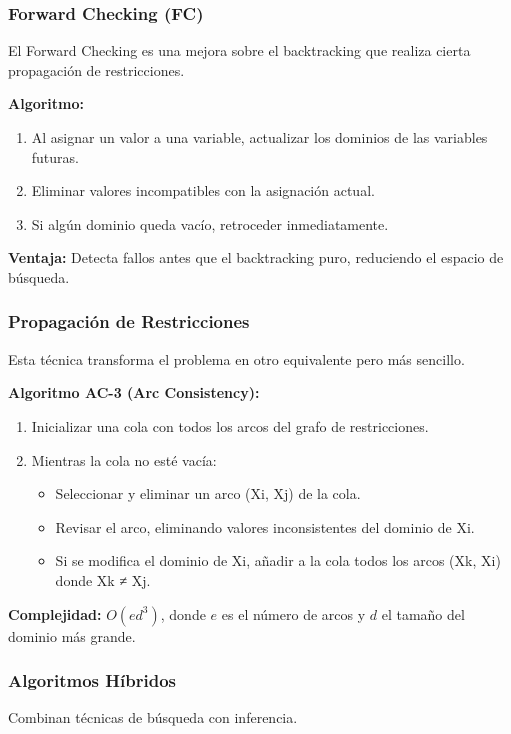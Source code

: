 \documentclass[12pt,a4paper]{report}
\begin{document}
\subsubsection{Forward Checking (FC)}
El Forward Checking es una mejora sobre el backtracking que realiza cierta propagación de restricciones.

\textbf{Algoritmo:}
\begin{enumerate}
    \item Al asignar un valor a una variable, actualizar los dominios de las variables futuras.
    \item Eliminar valores incompatibles con la asignación actual.
    \item Si algún dominio queda vacío, retroceder inmediatamente.
\end{enumerate}

\textbf{Ventaja:} Detecta fallos antes que el backtracking puro, reduciendo el espacio de búsqueda.

\subsubsection{Propagación de Restricciones}
Esta técnica transforma el problema en otro equivalente pero más sencillo.

\textbf{Algoritmo AC-3 (Arc Consistency):}
\begin{enumerate}
    \item Inicializar una cola con todos los arcos del grafo de restricciones.
    \item Mientras la cola no esté vacía:
    \begin{itemize}
        \item Seleccionar y eliminar un arco (Xi, Xj) de la cola.
        \item Revisar el arco, eliminando valores inconsistentes del dominio de Xi.
        \item Si se modifica el dominio de Xi, añadir a la cola todos los arcos (Xk, Xi) donde Xk ≠ Xj.
    \end{itemize}
\end{enumerate}

\textbf{Complejidad:} $O(ed^3)$, donde $e$ es el número de arcos y $d$ el tamaño del dominio más grande.

\subsubsection{Algoritmos Híbridos}
Combinan técnicas de búsqueda con inferencia.
\end{document}
